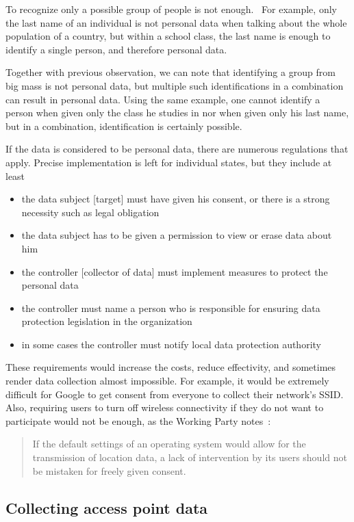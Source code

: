 \documentclass[12pt,a4paper,oneside,pdftex]{report}
\begin{document}
To recognize only a possible group of people is not enough.~\cite{wp29_136} For example, only the last name of an individual is not personal data when talking about the whole population of a country, but within a school class, the last name is enough to identify a single person, and therefore personal data.

Together with previous observation, we can note that identifying a group from big mass is not personal data, but multiple such identifications in a combination can result in personal data. Using the same example, one cannot identify a person when given only the class he studies in nor when given only his last name, but in a combination, identification is certainly possible.

If the data is considered to be personal data, there are numerous regulations that apply. Precise implementation is left for individual states, but they include at least
\begin{itemize}
    \item the data subject [target] must have given his consent, or there is a strong necessity such as legal obligation
    \item the data subject has to be given a permission to view or erase data about him
    \item the controller [collector of data] must implement measures to protect the personal data
    \item the controller must name a person who is responsible for ensuring data protection legislation in the organization
    \item in some cases the controller must notify local data protection authority
\end{itemize}

These requirements would increase the costs, reduce effectivity, and sometimes render data collection almost impossible. For example, it would be extremely difficult for Google to get consent from everyone to collect their network's SSID. Also, requiring users to turn off wireless connectivity if they do not want to participate would not be enough, as the Working Party notes~\cite{wp29_185}:
\begin{quote}
    If the default settings of an operating system would allow for the transmission of location data, a lack of intervention by its users should not be mistaken for freely given consent.
\end{quote}


\subsection{Collecting access point data}
\label{subsec:eu_collect}
\end{document}
